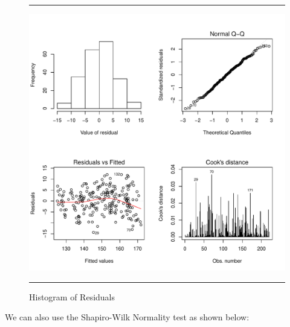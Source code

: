 \documentclass[11pt, letterpaper, twoside]{memoir}\usepackage{knitr}
\begin{document}
\begin{figure}
\centering
\rule{4in}{1pt}
\begin{knitrout}
\color{fgcolor}\begin{kframe}
\begin{alltt}
\hlstd{(}\hlstd{=}\hlstd{(}\hlstd{,}\hlstd{))}
\hlstd{(} \hlstd{=}   \hlstd{=} \hlstd{,} \hlstd{=}\hlstd{)}
\hlstd{(} \hlstd{=}\hlstd{)} 
\hlstd{(} \hlstd{=}\hlstd{)} 
\hlstd{(} \hlstd{=}\hlstd{)} 
\end{alltt}
\end{kframe}
\includegraphics[width=\maxwidth]{figure/unnamed-chunk-47-1} 

\end{knitrout}
\caption{Histogram of Residuals}
\label{Fig:residuals}
\rule{4in}{1pt}
\end{figure}

We can also use the Shapiro-Wilk Normality test  as shown below:
\end{document}
